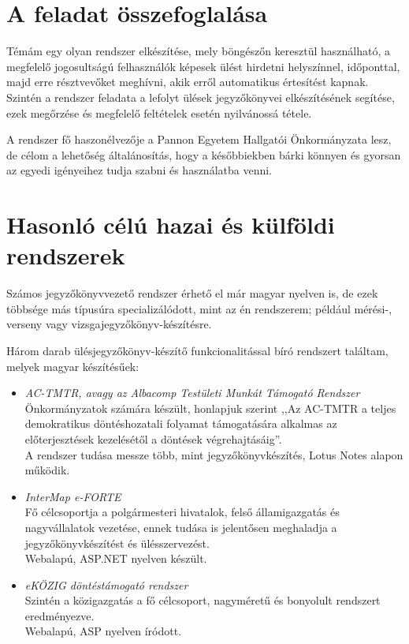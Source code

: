 \documentclass[a4paper,12pt,oneside]{report}
\begin{document}
\section{A feladat összefoglalása}

Témám egy olyan rendszer elkészítése, mely böngészőn keresztül használható, a megfelelő jogosultságú felhasználók képesek ülést hirdetni helyszínnel, időponttal, majd erre résztvevőket meghívni, akik erről automatikus értesítést kapnak. Szintén a rendszer feladata a lefolyt ülések jegyzőkönyvei elkészítésének segítése, ezek megőrzése és megfelelő feltételek esetén nyilvánossá tétele.

A rendszer fő haszonélvezője a Pannon Egyetem Hallgatói Önkormányzata lesz, de célom a lehetőség általánosítás, hogy a későbbiekben bárki könnyen és gyorsan az egyedi igényeihez tudja szabni és használatba venni.

\section{Hasonló célú hazai és külföldi rendszerek}

Számos jegyzőkönyvvezető rendszer érhető el már magyar nyelven is, de ezek többsége más típusúra specializálódott, mint az én rendszerem; például mérési-, verseny vagy vizsgajegyzőkönyv-készítésre.

Három darab ülésjegyzőkönyv-készítő funkcionalitással bíró rendszert találtam, melyek magyar készítésűek:

\begin{itemize}

    \item \emph{AC-TMTR, avagy az Albacomp Testületi Munkát Támogató Rendszer}\cite{website:actmtr}\\
    Önkormányzatok számára készült, honlapjuk szerint ,,Az AC-TMTR a teljes demokratikus döntéshozatali folyamat támogatására alkalmas az előterjesztések kezelésétől a döntések végrehajtásáig''.\\
    A rendszer tudása messze több, mint jegyzőkönyvkészítés, Lotus Notes alapon működik.
    
    \item \emph{InterMap e-FORTE}\cite{website:eforte}\\
    Fő célcsoportja a polgármesteri hivatalok, felső államigazgatás és nagyvállalatok vezetése, ennek tudása is jelentősen meghaladja a jegyzőkönyvkészítést és ülésszervezést.\\
    Webalapú, ASP.NET nyelven készült.
    
    \item \emph{eKÖZIG döntéstámogató rendszer}\cite{website:ekozig}\\
    Szintén a közigazgatás a fő célcsoport, nagyméretű és bonyolult rendszert eredményezve.\\
    Webalapú, ASP nyelven íródott.
    
\end{itemize}
\end{document}
